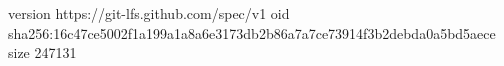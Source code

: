 version https://git-lfs.github.com/spec/v1
oid sha256:16c47ce5002f1a199a1a8a6e3173db2b86a7a7ce73914f3b2debda0a5bd5aece
size 247131
